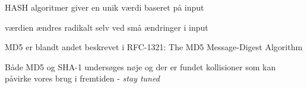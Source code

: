 

\begin{list1}
\item HASH algoritmer giver en unik værdi baseret på input
\item værdien ændres radikalt selv ved små ændringer i input
\item MD5 er blandt andet beskrevet i RFC-1321: The MD5 Message-Digest
  Algorithm 
\item Både MD5 og SHA-1 undersøges nøje og der er fundet kollisioner
  som kan påvirke vores brug i fremtiden - \emph{stay tuned}
\end{list1} 

